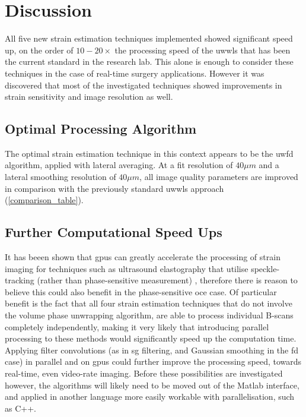 \chapter{Discussion}


All five new strain estimation techniques implemented showed significant speed up, on the order of $10-20\times$ the processing speed of the \ac{uwwls} that has been the current standard in the research lab. This alone is enough to consider these techniques in the case of real-time surgery applications. However it was discovered that most of the investigated techniques showed improvements in strain sensitivity and image resolution as well.

\section{Optimal Processing Algorithm}

The optimal strain estimation technique in this context appears to be the \ac{uwfd} algorithm, applied with lateral averaging. At a fit resolution of $40\mu m$ and a lateral smoothing resolution of $40\mu m$, all image quality parameters are improved in comparison with the previously standard \ac{uwwls} approach (\autoref{comparison_table}).

\section{Further Computational Speed Ups}

It has beeen shown that \ac{gpu}s can greatly accelerate the processing of strain imaging for techniques such as ultrasound elastography that utilise speckle-tracking (rather than phase-sensitive measurement) \cite{peng_gpu-accelerated_2017}, therefore there is reason to believe this could also benefit in the phase-sensitive \ac{oce} case. Of particular benefit is the fact that all four strain estimation techniques that do not involve the volume phase unwrapping algorithm, are able to process individual B-scans completely independently, making it very likely that introducing parallel processing to these methods would significantly speed up the computation time. Applying filter convolutions (as in \ac{sg} filtering, and Gaussian smoothing in the \ac{fd} case) in parallel and on \ac{gpu}s could further improve the processing speed, towards real-time, even video-rate imaging.
Before these possibilities are investigated however, the algorithms will likely need to be moved out of the Matlab interface, and applied in another language more easily workable with parallelisation, such as C++.

